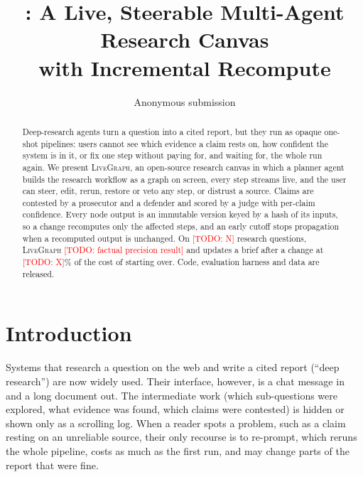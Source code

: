 \documentclass[11pt]{article}
\title{\sys: A Live, Steerable Multi-Agent Research Canvas\\with Incremental Recompute}
\author{Anonymous submission}
\newcommand{\todo}[1]{\textcolor{red}{[TODO: #1]}}
\newcommand{\sys}{\textsc{LiveGraph}}
\begin{document}
\maketitle

\begin{abstract}
Deep-research agents turn a question into a cited report, but they run as opaque one-shot pipelines:
users cannot see which evidence a claim rests on, how confident the system is in it, or fix one step
without paying for, and waiting for, the whole run again. We present \sys{}, an open-source research
canvas in which a planner agent builds the research workflow as a graph on screen, every step streams
live, and the user can steer, edit, rerun, restore or veto any step, or distrust a source. Claims are
contested by a prosecutor and a defender and scored by a judge with per-claim confidence. Every node
output is an immutable version keyed by a hash of its inputs, so a change recomputes only the affected
steps, and an early cutoff stops propagation when a recomputed output is unchanged. On \todo{N} research
questions, \sys{} \todo{factual precision result} and updates a brief after a change at
\todo{X}\% of the cost of starting over. Code, evaluation harness and data are released.
\end{abstract}

\section{Introduction}
Systems that research a question on the web and write a cited report (``deep research'') are now
widely used. Their interface, however, is a chat message in and a long document out. The intermediate
work (which sub-questions were explored, what evidence was found, which claims were contested) is hidden
or shown only as a scrolling log. When a reader spots a problem, such as a claim resting on an unreliable
source, their only recourse is to re-prompt, which reruns the whole pipeline, costs as much as the first
run, and may change parts of the report that were fine.
\end{document}
